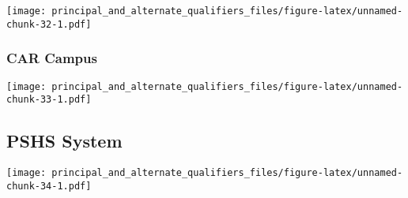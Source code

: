 \documentclass[]{article}
\begin{document}
\texttt{[image: principal\_and\_alternate\_qualifiers\_files/figure-latex/unnamed-chunk-32-1.pdf]}

\hypertarget{car-campus-1}{%
\subsubsection{CAR Campus}\label{car-campus-1}}

\texttt{[image: principal\_and\_alternate\_qualifiers\_files/figure-latex/unnamed-chunk-33-1.pdf]}

\hypertarget{pshs-system}{%
\subsection{PSHS System}\label{pshs-system}}

\texttt{[image: principal\_and\_alternate\_qualifiers\_files/figure-latex/unnamed-chunk-34-1.pdf]}
\end{document}
